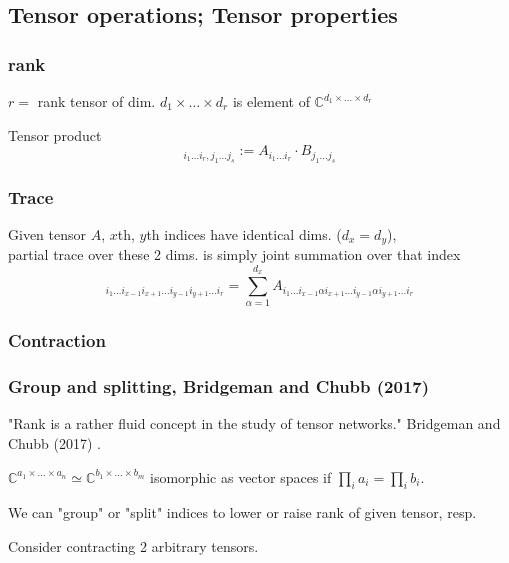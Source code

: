 \documentclass[10pt]{amsart}
\begin{document}
\begin{multicols*}{2}
\subsection{Tensor operations; Tensor properties}

\subsubsection{rank}

$r=$ rank tensor of dim. $d_1\times \dots \times d_r$ is element of $\mathbb{C}^{d_1\times \dots \times d_r}$  

Tensor product
\begin{equation}
	[A \otimes B]_{i_1 \dots i_r, j_1 \dots j_s } := A_{i_1 \dots i_r} \cdot B_{j_1 \dots j_s }
\end{equation}

\subsubsection{Trace}
Given tensor $A$, $x$th, $y$th indices have identical dims. ($d_x = d_y$), \\
partial trace over these 2 dims. is simply joint summation over that index
\begin{equation}
	[\text{Tr}_{x,y} A]_{i_1\dots i_{x-1}i_{x+1} \dots i_{y-1}i_{y+1} \dots i_r} = \sum_{\alpha=1}^{d_x} A_{i_1 \dots i_{x-1} \alpha i_{x+1} \dots i_{y-1} \alpha i_{y+1} \dots i_r}
\end{equation}

\subsubsection{Contraction}

\subsubsection{Group and splitting, Bridgeman and Chubb (2017) \cite{BrCh2017} }

"Rank is a rather fluid concept in the study of tensor networks."  Bridgeman and Chubb (2017) \cite{BrCh2017}.  

$\mathbb{C}^{a_1 \times \dots \times a_n} \simeq \mathbb{C}^{b_1 \times \dots \times b_m}$ isomorphic as vector spaces if $\prod_i a_i = \prod_i b_i$.  

We can "group" or "split" indices to lower or raise rank of given tensor, resp.  

Consider contracting 2 arbitrary tensors.  


\end{multicols*}
\end{document}
